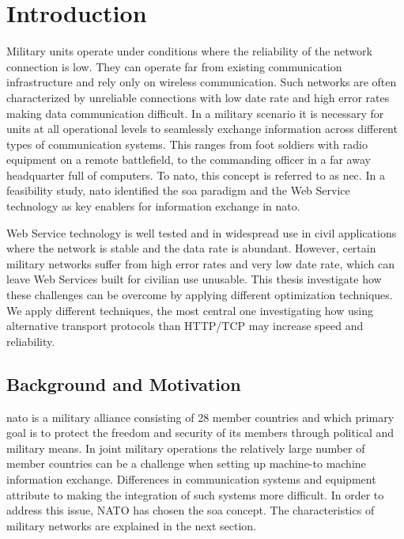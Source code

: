 \chapter{Introduction}

Military units operate under conditions where the reliability of the
network connection is low. They can operate far from existing communication
infrastructure and rely only on wireless communication. Such networks are
often characterized by unreliable connections with low date rate and high
error rates making data communication difficult. In a military scenario it is
necessary for units at all operational levels to seamlessly exchange
information across different types of communication systems. This ranges from
foot soldiers with radio equipment on a remote battlefield, to the commanding
officer in a far away headquarter full of computers. To \gls{nato}, this
concept is referred to as \gls{nec}. In a feasibility study, \gls{nato}
identified the \gls{soa} paradigm and the Web Service technology as key	
enablers for information exchange in \gls{nato}\cite{nnec-study}.

Web Service technology is well tested and in widespread use in civil
applications where the network is stable and the data rate is abundant.
However, certain military networks suffer from high error rates and very low
date rate, which can leave Web Services built for civilian use unusable. This
thesis investigate how these challenges can be overcome by applying  different
optimization techniques. We apply different techniques, the most central one
investigating how using alternative transport protocols than HTTP/TCP may
increase speed and reliability.


\section{Background and Motivation}

\gls{nato} is a military alliance consisting of 28 member countries
\cite{nato-homepage-member-countries} and which primary goal is to protect
the freedom and security of its members through political and military means.
In joint military operations the relatively large number of member countries
can be a challenge when setting up machine-to machine information exchange.
Differences in communication systems and equipment attribute to making the
integration of such systems more difficult. In order to address this issue,
NATO has chosen the \gls{soa} concept\cite{nnec-study}. The characteristics of
military networks are explained in the next section.


